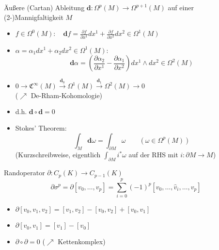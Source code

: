 \documentclass{beamer}
\renewcommand{\d}{\textbf{d}}
\newcommand{\ablx}[2]{\frac{\partial #1}{\partial x^{#2}}}
\begin{document}
  \begin{frame}
    \begin{block}{Äußere (Cartan) Ableitung \( \d: \Omega^{p}(M) \longrightarrow \Omega^{p+1}(M) \) auf einer (2-)Mannigfaltigkeit \( M \)}
      \begin{itemize}
        \item \( f \in \Omega^{0}(M):\quad \d f = \ablx{f}{1}dx^{1} + \ablx{f}{2}dx^{2} \in  \Omega^{1}(M)\)
        \item \( \alpha = \alpha_{1}dx^{1} + \alpha_{2}dx^{2} \in \Omega^{1}(M):\) 
                \[\d\alpha = \left( \ablx{\alpha_{2}}{1} - \ablx{\alpha_{1}}{2} \right) dx^{1} \wedge dx^{2} \in \Omega^{2}(M)\]
        \item \( 0 \rightarrow \mathfrak{C}^{\infty}(M) \overset{\d_{0}}{\rightarrow} \Omega^{1}(M) \overset{\d_{1}}{\rightarrow} \Omega^{2}(M) \rightarrow 0\) \\
              (\( \nearrow \) De-Rham-Kohomologie)
        \item d.h. \( \d\circ\d = 0 \)
        \item Stokes' Theorem: 
            \[ \int_{M}\d\omega = \int_{\partial M} \omega \qquad (\omega\in\Omega^{p}(M))\]
            (Kurzschreibweise, eigentlich \( \int_{\partial M} i^{*}\omega \) auf der RHS mit \( i: \partial M \rightarrow M \))
      \end{itemize}
    \end{block}
  \end{frame}

  \begin{frame}
    \begin{block}{Randoperator \( \partial:C_{p}(K) \longrightarrow C_{p-1}(K) \)}
      \[ \partial\sigma^{p} = \partial\left[ v_{0}, \ldots, v_{p} \right] = \sum_{i=0}^{p} (-1)^{p} \left[ v_{0}, \ldots, \hat{v}_{i}, \ldots,  v_{p} \right]\]
      \begin{itemize}
        \item \( \partial\left[ v_{0}, v_{1}, v_{2} \right] = \left[ v_{1}, v_{2} \right] - \left[ v_{0}, v_{2} \right] + \left[ v_{0}, v_{1} \right]\)
        \item \( \partial\left[ v_{0}, v_{1} \right] = \left[ v_{1} \right] - \left[ v_{0} \right]\)
        \item \( \partial\circ\partial = 0 \) \qquad(\( \nearrow \) Kettenkomplex)
      \end{itemize}
    \end{block}
  \end{frame}
\end{document}
